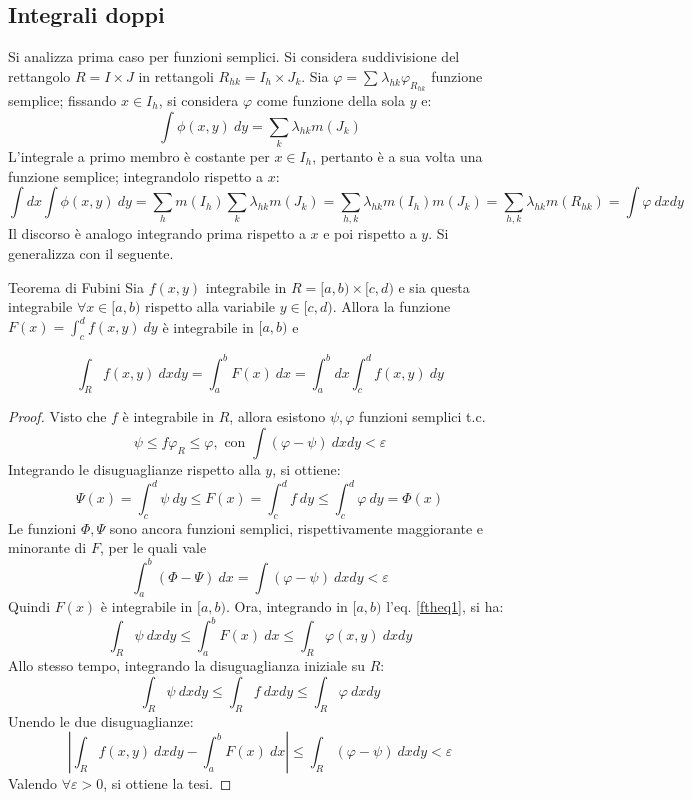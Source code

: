 \documentclass[10pt, a4paper]{scrartcl}
\theoremstyle{definition}
\numberwithin{esempio}{section}
\theoremstyle{definition}
\numberwithin{obs}{section}
\numberwithin{nota}{section}
\numberwithin{equation}{subsection}
\begin{document}
\subsection{Integrali doppi}
Si analizza prima caso per funzioni semplici. 
Si considera suddivisione del rettangolo $R=I\times J$ in rettangoli $R_{hk} = I_h \times J_k$.
Sia $\varphi = \sum_{}^{} \lambda _{hk}\varphi _{R_{hk} } $ funzione semplice; fissando $x \in I_h$, si considera $\varphi $ come funzione della sola $y$ e:
\[
\int \phi (x,y) \ dy = \sum_{k}^{} \lambda _{hk} m(J_k)
\]
L'integrale a primo membro \`e costante per $x \in I_h$, pertanto \`e a sua volta una funzione semplice; integrandolo rispetto a $x$:
\[
\int dx \int \phi (x,y) \ dy = \sum_{h}^{} m(I_h) \sum_{k}^{} \lambda _{hk} m(J_k)= \sum_{h,k}^{} \lambda _{hk} m(I_h)m(J_k) = \sum_{h,k}^{} \lambda _{hk} m(R_{hk} )= \int\varphi  \ dxdy
\] 
Il discorso \`e analogo integrando prima rispetto a $x$ e poi rispetto a $y$. 
Si generalizza con il seguente.
\begin{teorema}
	{Teorema di Fubini}{}
	Sia $f(x,y)$ integrabile in $R = [a,b) \times [c,d)$ e sia questa integrabile $\forall x \in [a,b)$ rispetto alla variabile $y \in [c,d)$. 
	Allora la funzione $F(x) = \int_{c} ^d f(x,y) \ dy$ \`e integrabile in $[a,b)$ e 

	\[
	\int_{R} f(x,y) \ dxdy = \int_{a} ^b F(x) \ dx = \int_{a} ^b dx \int_{c} ^d f(x,y) \ dy
	\] 
\begin{proof}
	Visto che $f$ \`e integrabile in $R$, allora esistono $\psi , \varphi $ funzioni semplici t.c.
	\[
	\psi \le f \varphi _R \le \varphi, \text{ con }   \int (\varphi -\psi ) \ dxdy < \varepsilon 
	\] 
	Integrando le disuguaglianze rispetto alla $y$, si ottiene:
	\begin{equation}\label{ftheq1}
	\Psi(x) = \int_c^d \psi \ dy \le F(x) = \int_{c} ^d f\ dy \le \int_{c} ^d \varphi \ dy = \Phi(x)
	\end{equation}
	Le funzioni $\Phi,\Psi$ sono ancora funzioni semplici, rispettivamente maggiorante e minorante di $F$, per le quali vale
	\[
	\int_{a} ^b (\Phi-\Psi) \ dx = \int (\varphi -\psi ) \ dxdy < \varepsilon 
	\] 
	Quindi $F(x)$ \`e integrabile in $[a,b)$.
	Ora, integrando in $[a,b)$ l'eq. \ref{ftheq1}, si ha:
	\[
	\int_{R} \psi  \ dxdy \le \int_{a} ^b F(x) \ dx \le  \int_{R} \varphi (x,y) \ dxdy
	\] 
	Allo stesso tempo, integrando la disuguaglianza iniziale su $R$:
	\[
	\int_{R} \psi  \ dxdy \le \int_{R} f \ dxdy \le \int_R \varphi  \ dxdy
	\] 
	Unendo le due disuguaglianze:
\[
\left\lvert \int_{R} f(x,y)\ dxdy - \int_{a} ^b F(x) \ dx \right\rvert \le \int_{R} (\varphi -\psi ) \ dxdy < \varepsilon
\] 
Valendo $\forall \varepsilon >0$, si ottiene la tesi.
\end{proof}	
\end{teorema}
\end{document}
